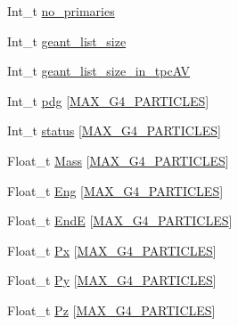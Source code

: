 \begin{DoxyCompactItemize}
\item 
Int\-\_\-t \hyperlink{classanatree_a76c6d8514cd78c8dd50ce0334e1c4d0b}{no\-\_\-primaries}
\item 
Int\-\_\-t \hyperlink{classanatree_a455af43b0d2a4febeb56b786b5ffa084}{geant\-\_\-list\-\_\-size}
\item 
Int\-\_\-t \hyperlink{classanatree_acca0dc16c2c962a20caff12197e3345d}{geant\-\_\-list\-\_\-size\-\_\-in\-\_\-tpc\-A\-V}
\item 
Int\-\_\-t \hyperlink{classanatree_a309376b30f569539cf8a46be0fd3330e}{pdg} \mbox{[}\hyperlink{anatree__core__v09410002_8h_aa5cbba5cc53c011e88805f38503de894}{M\-A\-X\-\_\-\-G4\-\_\-\-P\-A\-R\-T\-I\-C\-L\-E\-S}\mbox{]}
\item 
Int\-\_\-t \hyperlink{classanatree_a09a0173443fb9f8fe2991367ff7ed973}{status} \mbox{[}\hyperlink{anatree__core__v09410002_8h_aa5cbba5cc53c011e88805f38503de894}{M\-A\-X\-\_\-\-G4\-\_\-\-P\-A\-R\-T\-I\-C\-L\-E\-S}\mbox{]}
\item 
Float\-\_\-t \hyperlink{classanatree_a6acdd2c8c51383e29eab40fa56464b0c}{Mass} \mbox{[}\hyperlink{anatree__core__v09410002_8h_aa5cbba5cc53c011e88805f38503de894}{M\-A\-X\-\_\-\-G4\-\_\-\-P\-A\-R\-T\-I\-C\-L\-E\-S}\mbox{]}
\item 
Float\-\_\-t \hyperlink{classanatree_a09524750f273198e0a44997bbfea3b7a}{Eng} \mbox{[}\hyperlink{anatree__core__v09410002_8h_aa5cbba5cc53c011e88805f38503de894}{M\-A\-X\-\_\-\-G4\-\_\-\-P\-A\-R\-T\-I\-C\-L\-E\-S}\mbox{]}
\item 
Float\-\_\-t \hyperlink{classanatree_a7c87aaf34c469a1bb405c859379ce971}{End\-E} \mbox{[}\hyperlink{anatree__core__v09410002_8h_aa5cbba5cc53c011e88805f38503de894}{M\-A\-X\-\_\-\-G4\-\_\-\-P\-A\-R\-T\-I\-C\-L\-E\-S}\mbox{]}
\item 
Float\-\_\-t \hyperlink{classanatree_a81331574efd57def158e542793f3d8bf}{Px} \mbox{[}\hyperlink{anatree__core__v09410002_8h_aa5cbba5cc53c011e88805f38503de894}{M\-A\-X\-\_\-\-G4\-\_\-\-P\-A\-R\-T\-I\-C\-L\-E\-S}\mbox{]}
\item 
Float\-\_\-t \hyperlink{classanatree_a609f4c90a9506ef21de3159e319c85d9}{Py} \mbox{[}\hyperlink{anatree__core__v09410002_8h_aa5cbba5cc53c011e88805f38503de894}{M\-A\-X\-\_\-\-G4\-\_\-\-P\-A\-R\-T\-I\-C\-L\-E\-S}\mbox{]}
\item 
Float\-\_\-t \hyperlink{classanatree_a98146831ad9d99b688d08e79188e0fac}{Pz} \mbox{[}\hyperlink{anatree__core__v09410002_8h_aa5cbba5cc53c011e88805f38503de894}{M\-A\-X\-\_\-\-G4\-\_\-\-P\-A\-R\-T\-I\-C\-L\-E\-S}\mbox{]}
\item 

\end{DoxyCompactItemize}
